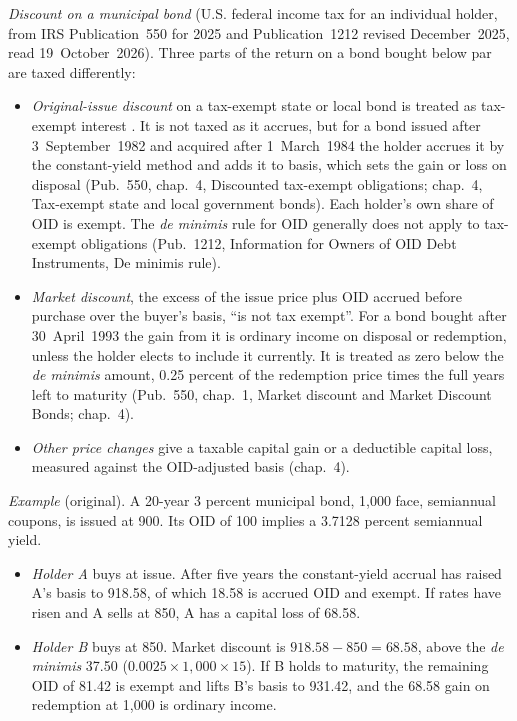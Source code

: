 \begin{qfrule}
\emph{Discount on a municipal bond} (U.S. federal income tax for an individual holder, from IRS Publication~550 for 2025 and Publication~1212 revised December~2025, read 19~October~2026). Three parts of the return on a bond bought below par are taxed differently:
\begin{itemize}
\item \emph{Original-issue discount} on a tax-exempt state or local bond is treated as tax-exempt interest \citep[chap.~1, Tax-Exempt Interest]{irs-pub-550-2025}. It is not taxed as it accrues, but for a bond issued after 3~September~1982 and acquired after 1~March~1984 the holder accrues it by the constant-yield method \citep[Figuring OID on Long-Term Debt Instruments, Debt Instruments Issued After 1984]{irs-pub-1212-2025} and adds it to basis, which sets the gain or loss on disposal (Pub.~550, chap.~4, Discounted tax-exempt obligations; chap.~4, Tax-exempt state and local government bonds). Each holder's own share of OID is exempt. The \emph{de minimis} rule for OID generally does not apply to tax-exempt obligations (Pub.~1212, Information for Owners of OID Debt Instruments, De minimis rule).
\item \emph{Market discount}, the excess of the issue price plus OID accrued before purchase over the buyer's basis, ``is not tax exempt''. For a bond bought after 30~April~1993 the gain from it is ordinary income on disposal or redemption, unless the holder elects to include it currently. It is treated as zero below the \emph{de minimis} amount, 0.25 percent of the redemption price times the full years left to maturity (Pub.~550, chap.~1, Market discount and Market Discount Bonds; chap.~4).
\item \emph{Other price changes} give a taxable capital gain or a deductible capital loss, measured against the OID-adjusted basis (chap.~4).
\end{itemize}
\emph{Example} (original). A 20-year 3 percent municipal bond, 1{,}000 face, semiannual coupons, is issued at 900. Its OID of 100 implies a 3.7128 percent semiannual yield.
\begin{itemize}
\item \emph{Holder A} buys at issue. After five years the constant-yield accrual has raised A's basis to 918.58, of which 18.58 is accrued OID and exempt. If rates have risen and A sells at 850, A has a capital loss of 68.58.
\item \emph{Holder B} buys at 850. Market discount is $918.58-850=68.58$, above the \emph{de minimis} 37.50 ($0.0025\times1{,}000\times15$). If B holds to maturity, the remaining OID of 81.42 is exempt and lifts B's basis to 931.42, and the 68.58 gain on redemption at 1{,}000 is ordinary income.

\end{itemize}
\end{qfrule}
